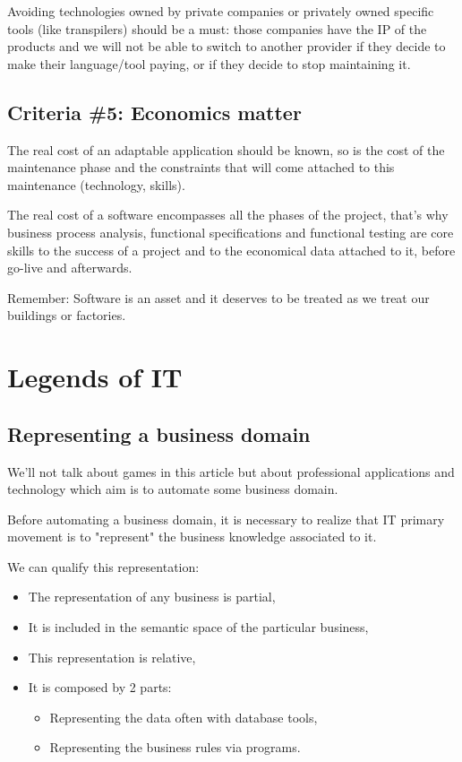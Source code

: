 \documentclass[]{article}
\begin{document}
Avoiding technologies owned by private companies or privately owned specific tools (like transpilers) should be a must: those companies have the IP of the products and we will not be able to switch to another provider if they decide to make their language/tool paying, or if they decide to stop maintaining it.

\subsection{Criteria \#5: Economics matter}

The real cost of an adaptable application should be known, so is the cost of the maintenance phase and the constraints that will come attached to this maintenance (technology, skills).

The real cost of a software encompasses all the phases of the project, that's why business process analysis, functional specifications and functional testing are core skills to the success of a project and to the economical data attached to it, before go-live and afterwards.

Remember: Software is an asset and it deserves to be treated as we treat our buildings or factories.

\section{Legends of IT}

\subsection{Representing a business domain}

We'll not talk about games in this article but about professional applications and technology which aim is to automate some business domain.

Before automating a business domain, it is necessary to realize that IT primary movement is to "represent" the business knowledge associated to it.

We can qualify this representation:

\begin{itemize}
\item The representation of any business is partial,
\item It is included in the semantic space of the particular business,
\item This representation is relative,
\item It is composed by 2 parts:
\begin{itemize}
\item Representing the data often with database tools,
\item Representing the business rules via programs.
\end{itemize}
\end{itemize}
\end{document}
